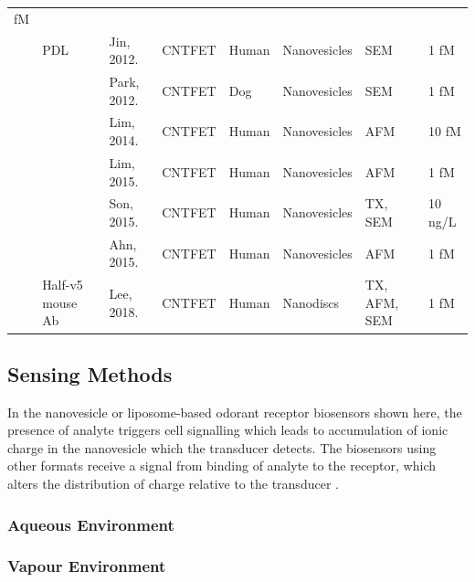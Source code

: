 \documentclass[
  a4paper,
]{scrbook}
\begin{document}
\begin{longtable}[]{@{}llllllll@{}}
fM \\
& PDL & Jin, 2012. \cite{Jin2012} & CNTFET & Human & Nanovesicles & SEM
& 1 fM \\
& & Park, 2012. \cite{Park2012a} & CNTFET & Dog & Nanovesicles & SEM & 1
fM \\
& & Lim, 2014. \cite{Lim2014} & CNTFET & Human & Nanovesicles & AFM & 10
fM \\
& & Lim, 2015. \cite{Lim2015} & CNTFET & Human & Nanovesicles & AFM & 1
fM \\
& & Son, 2015. \cite{Son2015} & CNTFET & Human & Nanovesicles & TX, SEM
& 10 ng/L \\
& & Ahn, 2015. \cite{Ahn2015} & CNTFET & Human & Nanovesicles & AFM & 1
fM \\
& Half-v5 mouse Ab & Lee, 2018. \cite{Lee2018} & CNTFET & Human &
Nanodiscs & TX, AFM, SEM & 1 fM \\
\end{longtable}

\newpage
{}

\hypertarget{sec-biosensor-methods}{%
\subsection{Sensing Methods}\label{sec-biosensor-methods}}

In the nanovesicle or liposome-based odorant receptor biosensors shown
here, the presence of analyte triggers cell signalling which leads to
accumulation of ionic charge in the nanovesicle which the transducer
detects. The biosensors using other formats receive a signal from
binding of analyte to the receptor, which alters the distribution of
charge relative to the transducer \autocite{Dung2018}.

\hypertarget{aqueous-environment}{%
\subsubsection*{Aqueous Environment}\label{aqueous-environment}}

\hypertarget{vapour-environment}{%
\subsubsection*{Vapour Environment}\label{vapour-environment}}
\end{document}
